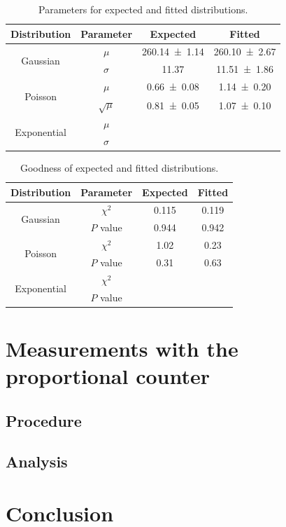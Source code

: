 \begin{table}[H]
	\renewcommand{\arraystretch}{1.5}
	\centering
	\begin{tabular}{|c|c|c|c|}
		\hline
		Distribution & Parameter & Expected & Fitted \\
		\hline
		\multirow{2}{*}{Gaussian} & $\mu$ & \SI{260.14 \pm 1.14}{} & \SI{260.10 \pm 2.67}{} \\
		 & $\sigma$ & \SI{11.37}{} & \SI{11.51 \pm 1.86}{} \\
		\hline
		\multirow{2}{*}{Poisson} & $\mu$ & \SI{0.66 \pm 0.08}{} & \SI{1.14 \pm 0.20}{} \\
		 & $\sqrt{\mu}$ & \SI{0.81 \pm 0,05}{} & \SI{1,07 \pm 0,10}{} \\
		\hline
		\multirow{2}{*}{Exponential} & $\mu$ & \SI{}{} & \SI{}{} \\
		 & $\sigma$ & \SI{}{} & \SI{}{} \\
		\hline
	\end{tabular}
	\caption{Parameters for expected and fitted distributions.}
	\label{tab:DistPara}
\end{table}

\begin{table}[H]
	\renewcommand{\arraystretch}{1.5}
	\centering
	\begin{tabular}{|c|c|c|c|}
		\hline
		Distribution & Parameter & Expected & Fitted \\
		\hline
		\multirow{2}{*}{Gaussian} & $\chi^2$ & \SI{0.115}{} & \SI{0.119}{} \\
		 & $P$ value & \SI{0.944}{} & \SI{0.942}{} \\
		\hline
		\multirow{2}{*}{Poisson} & $\chi^2$ & \SI{1.02}{} & \SI{0.23}{} \\
		 & $P$ value & \SI{0.31}{} & \SI{0.63}{} \\
		\hline
		\multirow{2}{*}{Exponential} & $\chi^2$ & \SI{}{} & \SI{}{} \\
		 & $P$ value & \SI{}{} & \SI{}{} \\
		\hline
	\end{tabular}
	\caption{Goodness of expected and fitted distributions.}
	\label{tab:DistGood}
\end{table}

\section{Measurements with the proportional counter}

\subsection{Procedure}

\subsection{Analysis}

\section{Conclusion}




